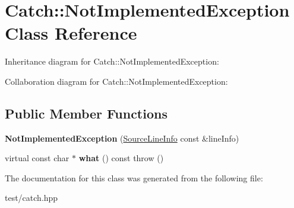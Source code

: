 \hypertarget{classCatch_1_1NotImplementedException}{}\section{Catch\+:\+:Not\+Implemented\+Exception Class Reference}
\label{classCatch_1_1NotImplementedException}


Inheritance diagram for Catch\+:\+:Not\+Implemented\+Exception\+:


Collaboration diagram for Catch\+:\+:Not\+Implemented\+Exception\+:
\subsection*{Public Member Functions}
\begin{DoxyCompactItemize}
\item 
{\bfseries Not\+Implemented\+Exception} (\hyperlink{structCatch_1_1SourceLineInfo}{Source\+Line\+Info} const \&line\+Info)\hypertarget{classCatch_1_1NotImplementedException_ab4f0a5c39d8ffb72c664e2c07e180634}{}\label{classCatch_1_1NotImplementedException_ab4f0a5c39d8ffb72c664e2c07e180634}

\item 
virtual const char $\ast$ {\bfseries what} () const   throw ()\hypertarget{classCatch_1_1NotImplementedException_a9d262173d2e1a5acccf8eb7b3a4859b6}{}\label{classCatch_1_1NotImplementedException_a9d262173d2e1a5acccf8eb7b3a4859b6}

\end{DoxyCompactItemize}


The documentation for this class was generated from the following file\+:\begin{DoxyCompactItemize}
\item 
test/catch.\+hpp\end{DoxyCompactItemize}
